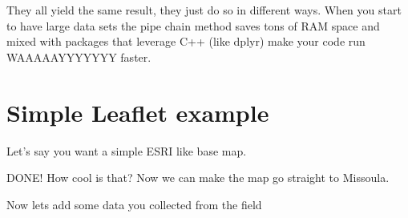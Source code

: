 \documentclass[]{article}
\newenvironment{Shaded}{\begin{snugshade}}{\end{snugshade}}
\newcommand{\DataTypeTok}[1]{\textcolor[rgb]{0.13,0.29,0.53}{#1}}
\newcommand{\DecValTok}[1]{\textcolor[rgb]{0.00,0.00,0.81}{#1}}
\newcommand{\FloatTok}[1]{\textcolor[rgb]{0.00,0.00,0.81}{#1}}
\newcommand{\KeywordTok}[1]{\textcolor[rgb]{0.13,0.29,0.53}{\textbf{#1}}}
\newcommand{\NormalTok}[1]{#1}
\newcommand{\OperatorTok}[1]{\textcolor[rgb]{0.81,0.36,0.00}{\textbf{#1}}}
\newcommand{\StringTok}[1]{\textcolor[rgb]{0.31,0.60,0.02}{#1}}
\begin{document}
They all yield the same result, they just do so in different ways. When
you start to have large data sets the pipe chain method saves tons of
RAM space and mixed with packages that leverage C++ (like dplyr) make
your code run WAAAAAYYYYYYY faster.

\hypertarget{simple-leaflet-example}{%
\section{Simple Leaflet example}\label{simple-leaflet-example}}

Let's say you want a simple ESRI like base map.

\begin{Shaded}
\end{Shaded}

DONE! How cool is that? Now we can make the map go straight to Missoula.

\begin{Shaded}
\end{Shaded}

Now lets add some data you collected from the field
\end{document}
